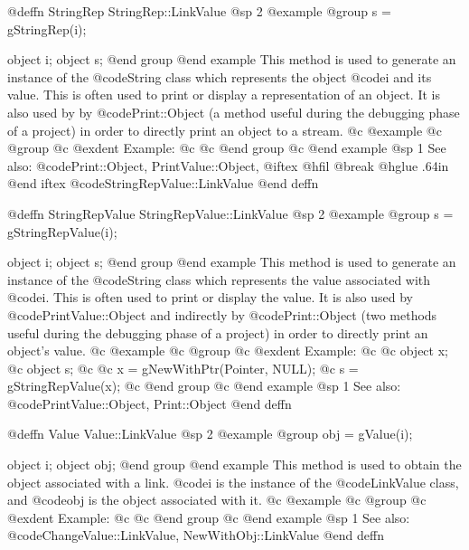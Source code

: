 @deffn {StringRep} StringRep::LinkValue
@sp 2
@example
@group
s = gStringRep(i);

object  i;
object  s;
@end group
@end example
This method is used to generate an instance of the @code{String} class
which represents the object @code{i} and its value.  This is often used
to print or display a representation of an object.  It is also used by
by @code{Print::Object} (a method useful during the debugging phase of
a project) in order to directly print an object to a stream.
@c @example
@c @group
@c @exdent Example:
@c 
@c @end group
@c @end example
@sp 1
See also:  @code{Print::Object, PrintValue::Object,}
@iftex
@hfil @break @hglue .64in      
@end iftex
@code{StringRepValue::LinkValue}
@end deffn









@deffn {StringRepValue} StringRepValue::LinkValue
@sp 2
@example
@group
s = gStringRepValue(i);

object  i;
object  s;
@end group
@end example
This method is used to generate an instance of the @code{String} class
which represents the value associated with @code{i}.  This is often
used to print or display the value.  It is also used by
@code{PrintValue::Object} and indirectly by @code{Print::Object}
(two methods useful during the debugging phase of a project)
in order to directly print an object's value.
@c @example
@c @group
@c @exdent Example:
@c 
@c object  x;
@c object  s;
@c 
@c x = gNewWithPtr(Pointer, NULL);
@c s = gStringRepValue(x);
@c @end group
@c @end example
@sp 1
See also:  @code{PrintValue::Object, Print::Object}
@end deffn






@deffn {Value} Value::LinkValue
@sp 2
@example
@group
obj = gValue(i);

object  i;
object  obj;
@end group
@end example
This method is used to obtain the object associated with a link.
@code{i} is the instance of the @code{LinkValue} class, and
@code{obj} is the object associated with it.
@c @example
@c @group
@c @exdent Example:
@c 
@c @end group
@c @end example
@sp 1
See also:  @code{ChangeValue::LinkValue, NewWithObj::LinkValue}
@end deffn









